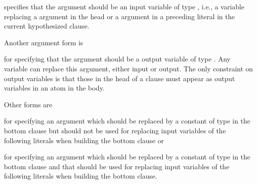 \documentclass[letterpaper,10pt,english]{sphinxmanual}
\begin{document}
\sphinxAtStartPar
specifies that the argument should be an input variable of type , i.e., a variable replacing a  argument in the head or a  argument in a preceding literal in the current hypothesized clause.

\sphinxAtStartPar
Another argument form is

\begin{sphinxVerbatim}[commandchars=\\\{\}]
\end{sphinxVerbatim}

\sphinxAtStartPar
for specifying that the argument should be a output variable of type .
Any variable can replace this argument, either input or output.
The only constraint on output variables is that those in the head of a clause must appear as output variables in an atom in the body.

\sphinxAtStartPar
Other forms are

\begin{sphinxVerbatim}[commandchars=\\\{\}]
\end{sphinxVerbatim}

\sphinxAtStartPar
for specifying an argument which should be replaced by a constant of type  in the bottom clause but should not be used for replacing input variables of the following literals when building the bottom clause or

\begin{sphinxVerbatim}[commandchars=\\\{\}]
\end{sphinxVerbatim}

\sphinxAtStartPar
for specifying an argument which should be replaced by a constant of type  in the bottom clause and that should be used for replacing input variables of the following literals when building the bottom clause.

\begin{sphinxVerbatim}[commandchars=\\\{\}]
\end{sphinxVerbatim}
\end{document}
